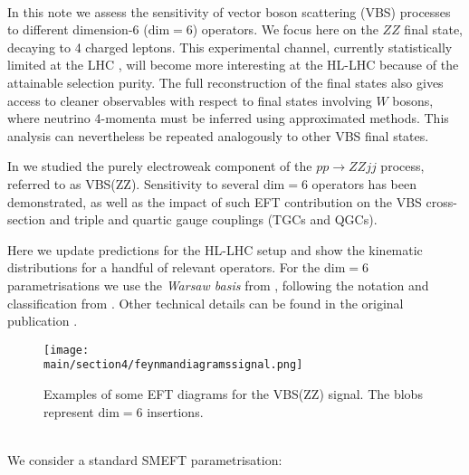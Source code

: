\documentclass[../report.tex]{subfiles}
\providecommand{\main}{..}
\begin{document}
\\
In this note we assess the sensitivity of vector boson scattering (VBS) processes to different dimension-6 ($\mathrm{dim=6}$) operators. We focus here on the $ZZ$ final state, decaying to 4 charged leptons. This experimental channel, currently statistically limited at the LHC \cite{Sirunyan:2017fvv}, will become more interesting at the HL-LHC because of the attainable selection purity. The full reconstruction of the final states also gives access to cleaner observables with respect to final states involving $W$ bosons, where neutrino 4-momenta must be inferred using approximated methods.
This analysis can nevertheless be repeated analogously to other VBS final states. 

In \cite{Gomez-Ambrosio:2018pnl} we studied the purely electroweak component of the $p p \to Z Z j j$ process, referred to as VBS(ZZ). Sensitivity to several $\mathrm{dim=6}$ operators has been demonstrated, as well as the impact of such EFT contribution on the VBS cross-section and triple and quartic gauge couplings (TGCs and QGCs). 

Here we update predictions for the HL-LHC setup and show the kinematic distributions for a handful of relevant operators. For the $\mathrm{dim=6}$ parametrisations we use the \emph{Warsaw basis} from \cite{Grzadkowski:2010es}, following the notation and classification from \cite{Jenkins:2013zja}. Other technical details can be found in the original publication \cite{Gomez-Ambrosio:2018pnl}.

\begin{figure}[h!]
\texttt{[image: \\main/section4/feynmandiagramssignal.png]}
\caption{Examples of some EFT diagrams for the VBS(ZZ) signal. The blobs represent $\mathrm{dim=6}$ insertions.}
\end{figure}

\\
%
We consider a standard SMEFT parametrisation:
\end{document}
